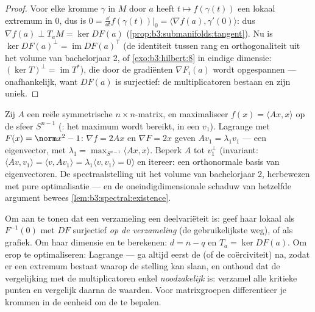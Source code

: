 \begin{proof}
Voor elke kromme $\gamma$ in $M$ door $a$ heeft $t \mapsto
f(\gamma(t))$ een lokaal extremum in $0$, dus is $0 =
\frac{\dd}{\dd t}f(\gamma(t))\big|_0 = \langle\nabla f(a),
\gamma'(0)\rangle$: dus $\nabla f(a) \perp T_aM = \ker DF(a)$
(\cref{prop:b3:submanifolds:tangent}). Nu is $\ker DF(a)^\perp =
\operatorname{im}DF(a)^{\mathsf T}$ (de identiteit tussen rang en
orthogonaliteit uit het volume van bachelorjaar 2, of
\cref{exo:b3:hilbert:8} in eindige dimensie: $(\ker T)^\perp =
\operatorname{im}T^*$), die door de gradiënten $\nabla F_i(a)$
wordt opgespannen --- onafhankelijk, want $DF(a)$ is surjectief:
de multiplicatoren bestaan en zijn uniek.
\end{proof}

\begin{example}
\label{ex:b3:submanifolds:rayleigh}
Zij $A$ een reële symmetrische $n\times n$-matrix, en
maximaliseer $f(x) = \langle Ax, x\rangle$ op de sfeer $S^{n-1}$
(: het maximum wordt bereikt, in een $v_1$). Lagrange met
$F(x) = \norm x^2 - 1$: $\nabla f = 2Ax$ en $\nabla F = 2x$ geven
$Av_1 = \lambda_1v_1$ --- een eigenvector, met $\lambda_1 =
\max_{S^{n-1}}\langle Ax, x\rangle$. Beperk $A$ tot $v_1^\perp$
(invariant: $\langle Av, v_1\rangle = \langle v, Av_1\rangle =
\lambda_1\langle v, v_1\rangle = 0$) en itereer: een orthonormale
basis van eigenvectoren. De spectraalstelling uit het volume van
bachelorjaar 2, herbewezen met pure optimalisatie --- en de
oneindigdimensionale schaduw van hetzelfde argument bewees
\cref{lem:b3:spectral:existence}.
\end{example}

\begin{method}\label{met:b3:submanifolds:method}
Om aan te tonen dat een verzameling een deelvariëteit is: geef
haar lokaal als $F^{-1}(0)$ met $DF$ surjectief \emph{op de
verzameling} (de gebruikelijkste weg), of als grafiek. Om haar
dimensie en  te berekenen: $d = n - q$ en $T_a = \ker
DF(a)$. Om erop te optimaliseren: Lagrange --- ga altijd eerst de
 (of de coërciviteit) na, zodat er een extremum
bestaat waarop de stelling kan slaan, en onthoud dat de
vergelijking met de multiplicatoren enkel \emph{noodzakelijk} is:
verzamel alle kritieke punten en vergelijk daarna de waarden.
Voor matrixgroepen differentieer je krommen in de eenheid om de
 te bepalen.
\end{method}

